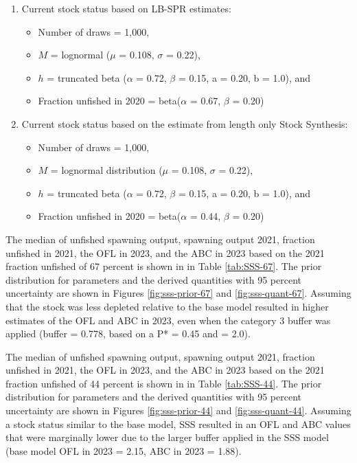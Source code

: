 \documentclass[11pt,
  english,
  a4paper,
]{article}
\begin{document}
\leavevmode\tagmcend\tagstructend\par

\begin{enumerate}  
    \item Current stock status based on LB-SPR estimates: 
        \begin{itemize}
        \item Number of draws = 1,000,
        \item $M$ = lognormal ($\mu$ = 0.108, $\sigma$ = 0.22),
        \item $h$ = truncated beta ($\alpha$ = 0.72, $\beta$ = 0.15, a = 0.20, b = 1.0), and
        \item Fraction unfished in 2020 = beta($\alpha$ = 0.67, $\beta$ = 0.20) 
    \end{itemize}
    \item Current stock status based on the estimate from length only Stock Synthesis:
    \begin{itemize}
        \item Number of draws = 1,000,
        \item $M$ = lognormal distribution ($\mu$ = 0.108, $\sigma$ = 0.22),
        \item $h$ = truncated beta ($\alpha$ = 0.72, $\beta$ = 0.15, a = 0.20, b = 1.0), and
        \item Fraction unfished in 2020 = beta($\alpha$ = 0.44, $\beta$ = 0.20)
    \end{itemize}   
\end{enumerate}


The median of unfished spawning output, spawning output 2021, fraction unfished in 2021, the OFL in 2023, and the ABC in 2023 based on the 2021 fraction unfished of 67 percent is shown in in Table \ref{tab:SSS-67}. The prior distribution for parameters and the derived quantities with 95 percent uncertainty are shown in Figures \ref{fig:sss-prior-67} and \ref{fig:sss-quant-67}. Assuming that the stock was less depleted relative to the base model resulted in higher estimates of the OFL and ABC in 2023, even when the category 3 buffer was applied (buffer = 0.778, based on a P* = 0.45 and \sigma = 2.0).

\leavevmode\tagmcend\tagstructend\par


The median of unfished spawning output, spawning output 2021, fraction unfished in 2021, the OFL in 2023, and the ABC in 2023 based on the 2021 fraction unfished of 44 percent is shown in in Table \ref{tab:SSS-44}. The prior distribution for parameters and the derived quantities with 95 percent uncertainty are shown in Figures \ref{fig:sss-prior-44} and \ref{fig:sss-quant-44}. Assuming a stock status similar to the base model, SSS resulted in an OFL and ABC values that were marginally lower due to the larger buffer applied in the SSS model (base model OFL in 2023 = 2.15, ABC in 2023 = 1.88).
\end{document}
